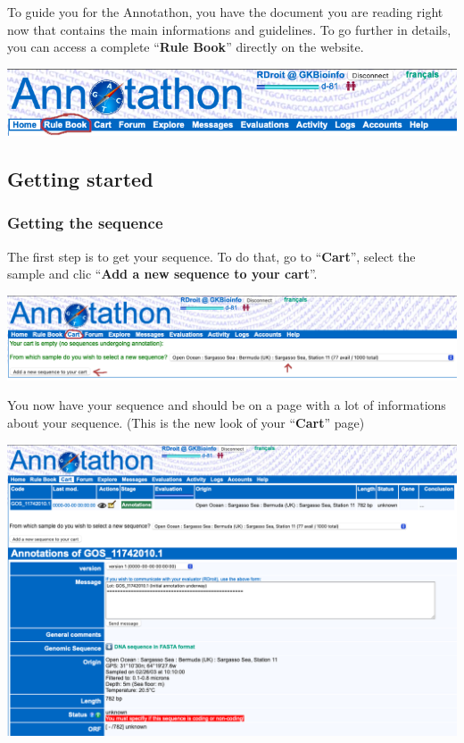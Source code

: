 \documentclass[
]{book}
\begin{document}
To guide you for the Annotathon, you have the document you are reading right now that contains the main informations and guidelines. To go further in details, you can access a complete ``\textbf{Rule Book}'' directly on the website.

\includegraphics{figures/Annotathon/Annot_access_rulebook.png}

\hypertarget{getting-started}{%
\subsection{Getting started}\label{getting-started}}

\hypertarget{getting-the-sequence}{%
\subsubsection{Getting the sequence}\label{getting-the-sequence}}

The first step is to get your sequence. To do that, go to ``\textbf{Cart}'', select the sample and clic ``\textbf{Add a new sequence to your cart}''.

\includegraphics{figures/Annotathon/Annot_add_sequence_to_cart.png}

You now have your sequence and should be on a page with a lot of informations about your sequence. (This is the new look of your ``\textbf{Cart}'' page)

\includegraphics{figures/Annotathon/Annot_your_sequence.png}
\end{document}
